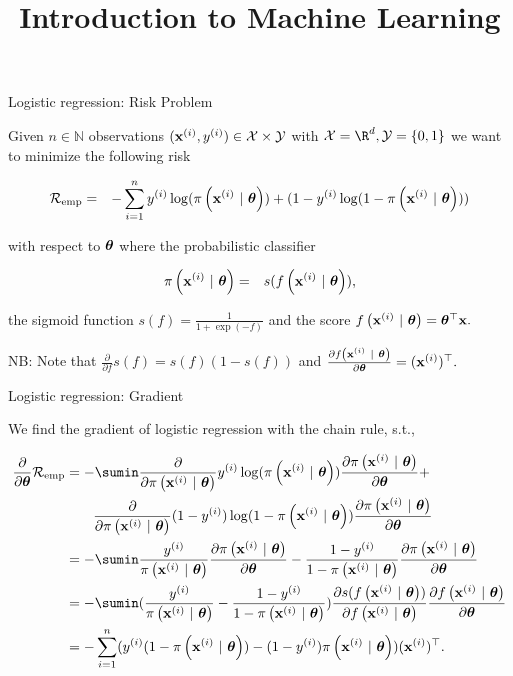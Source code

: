 \documentclass[11pt,compress,t,notes=noshow, xcolor=table]{beamer}
\title{Introduction to Machine Learning}
\begin{document}
    

\begin{frame}{Logistic regression: Risk Problem}

Given $n \in \mathbb{N}$ observations $(\mathbf{x}^{(i)}, y^{(i)}) \in \mathcal{X} \times \mathcal{Y}$ with  $\Xspace = \R^d, \Yspace = \{0, 1\}$ we want to minimize the following risk 

\begin{eqnarray*}
  \mathcal{R}_{\text{emp}}  & = & 
  -\sum^n_{i=1} y^{(i)}\log(\pi\left(\mathbf{x}^{(i)} ~|~ \bm{\theta}\right)) + (1-y^{(i)}\log(1-\pi\left(\mathbf{x}^{(i)} ~|~ \bm{\theta}\right)))
\end{eqnarray*}

with respect to $\bm{\theta}$ where the probabilistic classifier

\begin{eqnarray*}
  \pi\left(\mathbf{x}^{(i)} ~|~ \bm{\theta}\right)  & = & 
 s(f\left(\mathbf{x}^{(i)} ~|~ \bm{\theta}\right)),
\end{eqnarray*}

the sigmoid function $s(f) = \frac{1}{1 + \exp(-f)}$ and the score $f\left(\mathbf{x}^{(i)} ~|~ \bm{\theta}\right) = \bm{\theta}^\top \mathbf{x}.$

\vfill

NB: Note that $\frac{\partial}{\partial f} s(f) = s(f)(1-s(f))$ and $\frac{\partial f\left(\mathbf{x}^{(i)} ~|~ \bm{\theta}\right)}{\partial \bm{\theta}} = (\mathbf{x}^{(i)})^\top.$

\end{frame}

\begin{frame}{Logistic regression: Gradient}

We find the gradient of logistic regression with the chain rule, s.t., 

\vfill

{\small
\begin{align*}
  \frac{\partial}{\partial\thetav}\riske  & =  
 -\sumin \frac{\partial}{\partial\pixit }\yi\log(\pixit)\frac{\partial\pixit}{\partial \thetav} +  \\
 & \qquad \frac{\partial}{\partial\pixit} (1-\yi)\log(1-\pixit)\frac{\partial\pixit}{\partial \thetav}\\
 & =  
 -\sumin \frac{\yi}{\pixit}\frac{\partial\pixit}{\partial \thetav} -  \frac{1-\yi}{1-\pixit}\frac{\partial\pixit}{\partial \thetav}\\
 &=  
  -\sumin (\frac{\yi}{\pixit} -  \frac{1-\yi}{1-\pixit})\frac{\partial s(\fxit)}{\partial  \fxit}\frac{\partial  \fxit}{\partial\thetav}\\
  &=  
  -\sum^n_{i=1} (\yi(1-\pixit)  -  (1-\yi)\pixit )(\xi)^\top.\\
\end{align*}
}


\end{frame}
\end{document}
